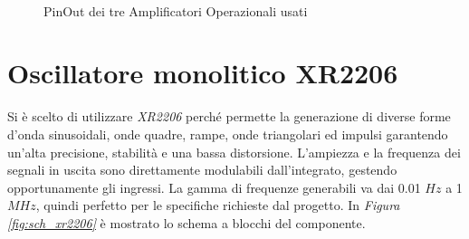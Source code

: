\documentclass[titlepage]{report}
\begin{document}
	\begin{figure}[H]
		\centering
		 \qquad
		 \qquad 
		 \\
		\caption{PinOut dei tre Amplificatori Operazionali usati}
		\label{fig:pinout_OpAmp}
	\end{figure}

	
\section{Oscillatore monolitico XR2206}
	\label{sec:XR2206}
	
	Si è scelto di utilizzare \textit{XR2206} perché permette la generazione di diverse forme d'onda sinusoidali, onde quadre, rampe, onde triangolari ed impulsi garantendo un'alta precisione, stabilità e una bassa distorsione. L'ampiezza e la frequenza dei segnali in uscita sono direttamente modulabili dall'integrato, gestendo opportunamente gli ingressi. La gamma di frequenze generabili va dai 0.01 $Hz$ a 1 $MHz$, quindi perfetto per le specifiche richieste dal progetto. 
	In \textit{Figura \ref{fig:sch_xr2206}} è mostrato lo schema a blocchi del componente.
	
\end{document}

